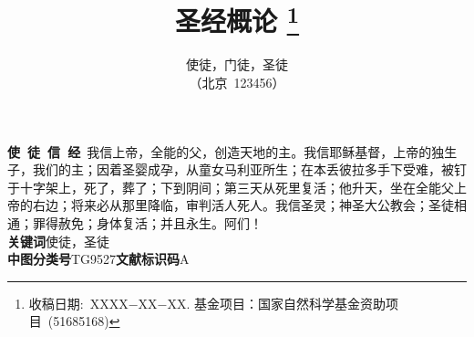 \documentclass[a4paper,11pt,onecolumn,twoside]{ctexart}
\title{
	\huge{圣经概论}
	\thanks{收稿日期:~XXXX$-$XX$-$XX. 基金项目：国家自然科学基金资助项目~(51685168)}
}
\author{使徒，门徒，圣徒\\[2pt]
	\normalsize（北京~123456） \\[2pt]
}
\date{}  %
\begin{document}
\newcommand{\supercite}[1]{\textsuperscript{\cite{#1}}}
\maketitle

\setlength{\oddsidemargin}{ 1cm}  %
\setlength{\evensidemargin}{\oddsidemargin}
\setlength{\textwidth}{13.50cm}
\vspace{-.8cm}
\begin{center}
	\parbox{\textwidth}{
		\textbf{使~徒~信~经}\quad ~我信上帝，全能的父，创造天地的主。我信耶稣基督，上帝的独生子，我们的主；因着圣婴成孕，从童女马利亚所生；在本丢彼拉多手下受难，被钉于十字架上，死了，葬了；下到阴间；第三天从死里复活；他升天，坐在全能父上帝的右边；将来必从那里降临，审判活人死人。我信圣灵；神圣大公教会；圣徒相通；罪得赦免；身体复活；并且永生。阿们！\\
		\textbf{关键词}\quad 使徒，圣徒\\
		\textbf{中图分类号}\quad TG9527\qquad  \textbf{文献标识码}\quad A}
\end{center}
\end{document}
